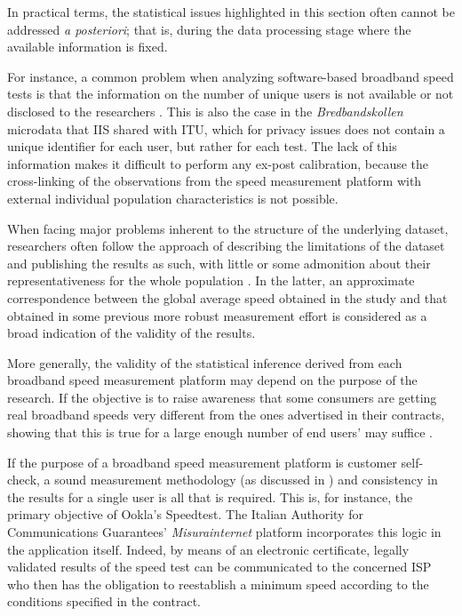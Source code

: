 \documentclass[12pt]{article}
\begin{document}
In practical terms, the statistical issues highlighted in this section often cannot be addressed \textit{a posteriori}; that is, during the data processing stage where the available information is fixed. 

For instance, a common problem when analyzing software-based broadband speed tests is that the information on the number of unique users is not available or not disclosed to the researchers \citep{canadi2012}. This is also the case in the \textit{Bredbandskollen} microdata that IIS shared with ITU, which for privacy issues does not contain a unique identifier for each user, but rather for each test. The lack of this information makes it difficult to perform any ex-post calibration, because the cross-linking of the observations from the speed measurement platform with external individual population characteristics is not possible.

When facing major problems inherent to the structure of the underlying dataset, researchers often follow the approach of describing the limitations of the dataset and publishing the results as such, with little \citep{prasad2016,wattegama2011,chetty2013} or some admonition about their representativeness for the whole population \citep{canadi2012,riddlesden2014}. In the latter, an approximate correspondence between the global average speed obtained in the study and that obtained in some previous more robust measurement effort is considered as a broad indication of the validity of the results.   
   
More generally, the validity of the statistical inference derived from each broadband speed measurement platform may depend on the purpose of the research. If the objective is to raise awareness that some consumers are getting real broadband speeds very different from the ones advertised in their contracts, showing that this is true for a large enough number of end users' may suffice \citep{chetty2013,wattegama2011}. 

If the purpose of a broadband speed measurement platform is customer self-check, a sound measurement methodology (as discussed in ) and consistency in the results for a single user is all that is required. This is, for instance, the primary objective of Ookla's Speedtest. The Italian Authority for Communications Guarantees' \textit{Misurainternet} platform incorporates this logic in the application itself. Indeed, by means of an electronic certificate, legally validated results of the speed test can be communicated to the concerned ISP who then has the obligation to reestablish a minimum speed according to the conditions specified in the contract.
\end{document}
